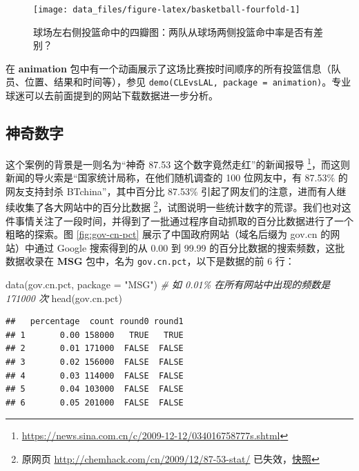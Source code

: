 \documentclass[
  b5paper,
  UTF8,twoside]{book}
\newenvironment{Shaded}{\begin{snugshade}}{\end{snugshade}}
\newcommand{\AttributeTok}[1]{\textcolor[rgb]{0.77,0.63,0.00}{#1}}
\newcommand{\CommentTok}[1]{\textcolor[rgb]{0.56,0.35,0.01}{\textit{#1}}}
\newcommand{\FunctionTok}[1]{\textcolor[rgb]{0.00,0.00,0.00}{#1}}
\newcommand{\NormalTok}[1]{#1}
\newcommand{\StringTok}[1]{\textcolor[rgb]{0.31,0.60,0.02}{#1}}
\begin{document}
\begin{figure}

{\centering \texttt{[image: data\_files/figure-latex/basketball-fourfold-1]} 

}

\caption[ 球场左右侧投篮命中的四瓣图 ]{球场左右侧投篮命中的四瓣图：两队从球场两侧投篮命中率是否有差别？}\label{fig:basketball-fourfold}
\end{figure}



在 \textbf{animation} 包中有一个动画展示了这场比赛按时间顺序的所有投篮信息（队员、位置、结果和时间等），参见 \texttt{demo(\textquotesingle{}CLEvsLAL\textquotesingle{},\ package\ =\ \textquotesingle{}animation\textquotesingle{})}。专业球迷可以去前面提到的网站下载数据进一步分析。

\hypertarget{subsec:percentage}{%
\subsection{神奇数字}\label{subsec:percentage}}

这个案例的背景是一则名为``神奇 87.53 这个数字竟然走红''的新闻报导 \footnote{\url{https://news.sina.com.cn/c/2009-12-12/034016758777s.shtml}}，而这则新闻的导火索是``国家统计局称，在他们随机调查的 100 位网友中，有 87.53\% 的网友支持封杀 BTchina''，其中百分比 87.53\% 引起了网友们的注意，进而有人继续收集了各大网站中的百分比数据 \footnote{原网页 \url{http://chemhack.com/cn/2009/12/87-53-stat/} 已失效，\href{https://web.archive.org/web/20120115032226/http://chemhack.com/cn/2009/12/87-53-stat/}{快照}}，试图说明一些统计数字的荒谬。我们也对这件事情关注了一段时间，并得到了一批通过程序自动抓取的百分比数据进行了一个粗略的探索。图 \ref{fig:gov-cn-pct} 展示了中国政府网站（域名后缀为 gov.cn 的网站）中通过 Google 搜索得到的从 0.00 到 99.99 的百分比数据的搜索频数，这批数据收录在 \textbf{MSG} 包中，名为 \texttt{gov.cn.pct}，以下是数据的前 6 行：

\begin{Shaded}
\begin{Highlighting}[]
\FunctionTok{data}\NormalTok{(gov.cn.pct, }\AttributeTok{package =} \StringTok{"MSG"}\NormalTok{)}
\CommentTok{\# 如 0.01\% 在所有网站中出现的频数是 171000 次}
\FunctionTok{head}\NormalTok{(gov.cn.pct)}
\end{Highlighting}
\end{Shaded}

\begin{verbatim}
##   percentage  count round0 round1
## 1       0.00 158000   TRUE   TRUE
## 2       0.01 171000  FALSE  FALSE
## 3       0.02 156000  FALSE  FALSE
## 4       0.03 114000  FALSE  FALSE
## 5       0.04 103000  FALSE  FALSE
## 6       0.05 201000  FALSE  FALSE
\end{verbatim}
\end{document}
